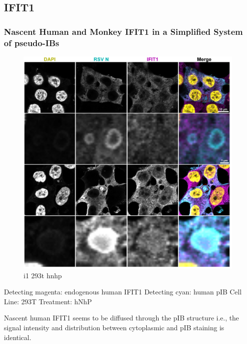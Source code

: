 \subsection{IFIT1} \label{IFIT1}
\subsubsection{Nascent Human and Monkey IFIT1 in a Simplified System of pseudo-IBs} \label{Nascent Human and Monkey IFIT1 in a Simplified System of pseudo-IBs}

\begin{figure}
    \centering
    \includegraphics[width=1\linewidth]{08. Chapter 3//Figs//02. IFIT1/01. endo_human.pdf}
    \caption[i1 293t hnhp]{i1 293t hnhp}
    \label{i1 293t hnhp}
\end{figure}

Detecting magenta: endogenous human IFIT1 \newline
Detecting cyan: human pIB \newline
Cell Line: 293T \newline
Treatment: hNhP \newline

Nascent human IFIT1 seems to be diffused through the pIB structure i.e., the signal intensity and distribution between cytoplasmic and pIB staining is identical.  

